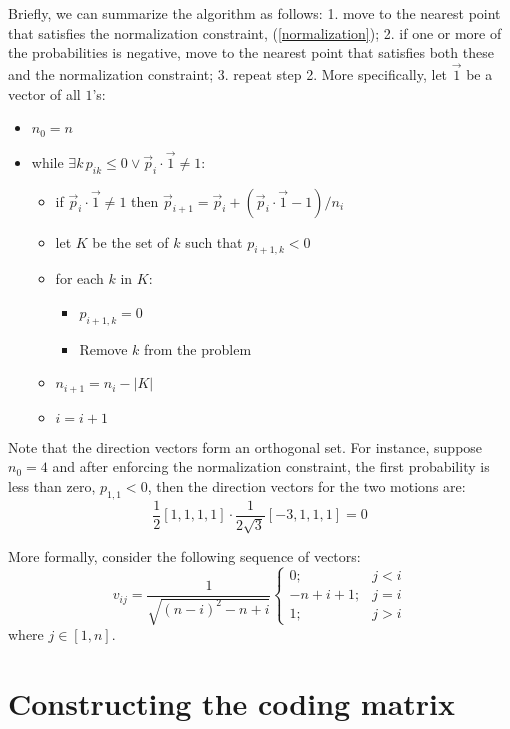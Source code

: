 Briefly, we can summarize the algorithm as follows:
1. move to the nearest point that satisfies the normalization constraint,
(\ref{normalization}); 2. if one or more of the probabilities is negative,
move to the nearest point that satisfies both these and the normalization
constraint; 3. repeat step 2.
More specifically, let $\vec 1$ be a vector of all $1$'s:
\begin{itemize}
	\item $n_0=n$
	\item while $\exists k \, p_{ik} \le 0 \lor \vec p_i \cdot \vec 1 \ne 1$:
	\begin{itemize}
		\item if $\vec p_i \cdot \vec 1 \ne 1$ then 
		$\vec p_{i+1} = \vec p_i + (\vec p_i \cdot \vec 1 - 1)/n_i$
		\item let $K$ be the set of $k$ such that $p_{i+1,k} < 0$
		\item for each $k$ in $K$:
		\begin{itemize}
			\item $p_{i+1,k}=0$
			\item Remove $k$ from the problem
		\end{itemize}
		\item $n_{i+1}=n_i-|K|$
		\item $i=i+1$
	\end{itemize}
\end{itemize}

Note that the direction vectors form an orthogonal set.
For instance, suppose $n_0=4$ and after enforcing the normalization constraint,
the first probability is less than zero, $p_{1,1} < 0$,
then the direction vectors for the two motions are:
\begin{equation}
	\frac{1}{2}[1, 1, 1, 1] \cdot \frac{1}{2\sqrt{3}} [-3, 1, 1, 1] = 0
\end{equation}

More formally, consider the following sequence of vectors:
\begin{equation}
	v_{ij} = \frac{1}{\sqrt{(n-i)^2-n+i}} \left \lbrace \begin{array}{rl}
			0; & j < i \\
			-n+i+1; & j=i \\
			1; & j > i
		\end{array} \right .
\end{equation}
where $j \in [1, n]$.


\section{Constructing the coding matrix}

